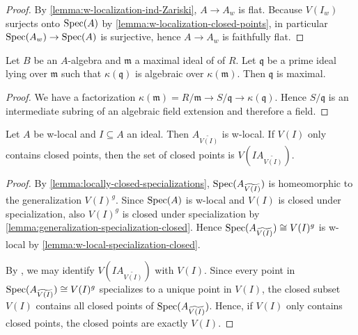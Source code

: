\begin{proof}
    By \ref{lemma:w-localization-ind-Zariski}, $A \to A_w$ is flat. Because
    $V(I_w)$ surjects onto $\mathrm{Spec}(A)$ by \ref{lemma:w-localization-closed-points},
    in particular $\mathrm{Spec}(A_w) \to \mathrm{Spec}(A)$ is surjective, hence
    $A \to A_w$ is faithfully flat.
\end{proof}

\begin{lemma}[\stacksproject{00GA}]
    Let $B$ be an $A$-algebra and $\mathfrak{m}$ a maximal ideal of of $R$. Let
    $\mathfrak{q}$ be a prime ideal lying over $\mathfrak{m}$ such that
    $\kappa(\mathfrak{q})$ is algebraic over $\kappa(\mathfrak{m})$. Then
    $\mathfrak{q}$ is maximal.
    \label{lemma:prime-over-maximal-algebraic}
\end{lemma}

\begin{proof}
    We have a factorization $\kappa(\mathfrak{m}) = R / \mathfrak{m} \to S / \mathfrak{q} \to \kappa(\mathfrak{q})$.
    Hence $S / \mathfrak{q}$ is an intermediate subring of an algebraic field extension and therefore
    a field.
\end{proof}

\begin{lemma}
    Let $A$ be w-local and $I \subseteq A$ an ideal. Then
    $A_{\widetilde{V(I)}}$ is w-local. If $V(I)$ only contains closed points, then
    the set of closed points is $V(IA_{\widetilde{V(I)}})$.
    \label{lemma:w-local-tilde-w-local}
\end{lemma}

\begin{proof}
    By \ref{lemma:locally-closed-specializations}, $\mathrm{Spec}(A_{\widetilde{V(I)}})$ is homeomorphic
    to the generalization $V(I)^g$. Since $\mathrm{Spec}(A)$ is w-local and $V(I)$ is closed
    under specialization, also $V(I)^g$ is closed under specialization by
    \ref{lemma:generalization-specialization-closed}. Hence
    $\mathrm{Spec}(A_{\widetilde{V(I)}}) \cong V(I)^g$ is w-local by \ref{lemma:w-local-specialization-closed}.

    By , we may identify $V(IA_{\widetilde{V(I)}})$ with
    $V(I)$.
    Since every point in
    $\mathrm{Spec}(A_{\widetilde{V(I)}}) \cong V(I)^g$ specializes to a unique point in $V(I)$,
    the closed subset $V(I)$ contains all closed points of $\mathrm{Spec}(A_{\widetilde{V(I)}})$. Hence,
    if $V(I)$ only contains closed points, the closed points are exactly $V(I)$.
\end{proof}


